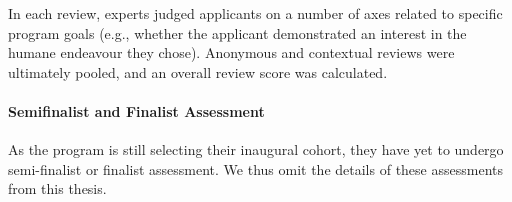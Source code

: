 In each review, experts judged applicants on a number of axes related to specific program goals (e.g., whether the applicant demonstrated an interest in the humane endeavour they chose). Anonymous and contextual reviews were ultimately pooled, and an overall review score was calculated.

\paragraph{Semifinalist and Finalist Assessment}
As the program is still selecting their inaugural cohort, they have yet to undergo semi-finalist or finalist assessment. We thus omit the details of these assessments from this thesis.